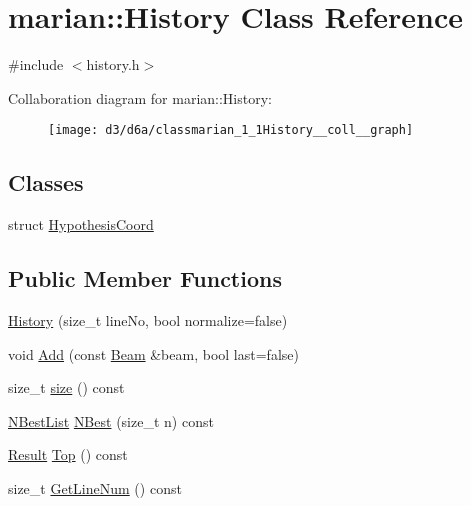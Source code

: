 \hypertarget{classmarian_1_1History}{}\section{marian\+:\+:History Class Reference}
\label{classmarian_1_1History}


{\ttfamily \#include $<$history.\+h$>$}



Collaboration diagram for marian\+:\+:History\+:
\nopagebreak
\begin{figure}[H]
\begin{center}
\leavevmode
\texttt{[image: d3/d6a/classmarian\_1\_1History\_\_coll\_\_graph]}
\end{center}
\end{figure}
\subsection*{Classes}
\begin{DoxyCompactItemize}
\item 
struct \hyperlink{structmarian_1_1History_1_1HypothesisCoord}{Hypothesis\+Coord}
\end{DoxyCompactItemize}
\subsection*{Public Member Functions}
\begin{DoxyCompactItemize}
\item 
\hyperlink{classmarian_1_1History_ab19b9b047826d261a3e974928112324c}{History} (size\+\_\+t line\+No, bool normalize=false)
\item 
void \hyperlink{classmarian_1_1History_a4234f2678e208ba1a7b971a02d332725}{Add} (const \hyperlink{namespacemarian_aebdf5ddcd9e7774939696be6e1ceb8f0}{Beam} \&beam, bool last=false)
\item 
size\+\_\+t \hyperlink{classmarian_1_1History_a5c416401eb3f4e852cef8f123871d87c}{size} () const 
\item 
\hyperlink{namespacemarian_aaae4a49bda201e73a4671babdb7df6b8}{N\+Best\+List} \hyperlink{classmarian_1_1History_ad182b116b7e4f77258e4605e1d0d40db}{N\+Best} (size\+\_\+t n) const 
\item 
\hyperlink{namespacemarian_a39014b8d5e6a286ac891f3da661d6a46}{Result} \hyperlink{classmarian_1_1History_aa992b2edf204a4b6e00bac53511b1d95}{Top} () const 
\item 
size\+\_\+t \hyperlink{classmarian_1_1History_af9fb02fdd4165303964b0e4117726137}{Get\+Line\+Num} () const 
\end{DoxyCompactItemize}
